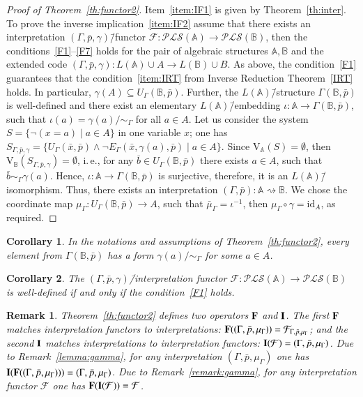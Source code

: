 \documentclass[12pt]{article}
\newtheorem{corollary}{Corollary}
\newtheorem{remark}{Remark}
\theoremstyle{definition}
\def\MA{{\mathbb{A}}}
\def\MB{{\mathbb{B}}}
\def\F{{\mathcal{F}}}
\def\PLS{{\mathcal{PLS}}}
\def\id{{\mathrm{id}}}
\def\V{{\mathrm{V}}}
\begin{document}
\begin{proof}[Proof of Theorem~\ref{th:functor2}]
Item~\ref{item:IF1} is given by Theorem~\ref{th:inter}. To prove the inverse implication~\ref{item:IF2} assume that there exists an interpretation $(\Gamma,\bar p,\gamma)$\=/functor $\F\colon\PLS(\MA)\to \PLS(\MB)$, then the  conditions~\ref{F1}--\ref{F7} holds for the pair of algebraic structures $\MA,\MB$ and the extended code $(\Gamma,\bar p,\gamma)\colon L(\MA)\cup A\to L(\MB)\cup B$. As above, the condition~\ref{F1} guarantees that the condition~\ref{item:IRT} from Inverse Reduction Theorem~\ref{IRT} holds. In particular, $\gamma(A)\subseteq U_\Gamma(\MB,\bar p)$. Further, the $L(\MA)$\=/structure $\Gamma(\MB,\bar p)$ is well-defined and there exist an elementary $L(\MA)$\=/embedding $\iota\colon \MA\to \Gamma(\MB,\bar p)$, such that 
$\iota(a)=\gamma(a)/{\sim_\Gamma}$ for all $a\in A$. Let us consider the system $S=\{\neg(x=a)\mid a\in A\}$ in one variable $x$; one has $S_{\Gamma,\bar p,\gamma}=\{U_\Gamma(\bar x,\bar p)\wedge \neg E_\Gamma(\bar x,\gamma(a),\bar p)\mid a\in A\}$. Since $\V_\MA(S)=\emptyset$, then $\V_\MB(S_{\Gamma,\bar p,\gamma})=\emptyset$, i.\,e., for any $\bar b\in U_\Gamma(\MB,\bar p)$ there exists $a\in A$, such that $\bar b\sim_\Gamma \gamma(a)$. Hence, $\iota\colon \MA\to \Gamma(\MB,\bar p)$ is surjective, therefore, it is an $L(\MA)$\=/isomorphism. Thus, there exists an interpretation $(\Gamma,\bar p)\colon \MA\rightsquigarrow \MB$. We chose the coordinate map $\mu_\Gamma\colon U_\Gamma(\MB,\bar p)\to A$, such that $\bar\mu_\Gamma=\iota^{-1}$, then $\mu_\Gamma\circ\gamma=\id_A$, as required.
\end{proof}

\begin{corollary}\label{cor:surj}
In the notations and assumptions of Theorem~\ref{th:functor2}, every element from $\Gamma(\MB,\bar p)$ has a form $\gamma(a)/{\sim_\Gamma}$ for some $a\in A$.
\end{corollary}

\begin{corollary}\label{cor:inj2}
The $(\Gamma,\bar p,\gamma)$\=/interpretation functor $\F\colon \PLS(\MA)\to \PLS(\MB)$ is well-defined if and only if the condition~\ref{F1} holds.
\end{corollary}

\begin{remark}\label{remark:gamma_int}
Theorem~\ref{th:functor2} defines two operators ${\bf F}$ and ${\bf I}$. The first ${\bf F}$ matches interpretation functors to interpretations: ${\bf F}((\Gamma,\bar p,\mu_\Gamma))= \F_{\Gamma,\bar p,\mu_\Gamma}$; and the second ${\bf I}$ matches interpretations to interpretation functors: ${\bf I}(\F)=(\Gamma,\bar p,\mu_\Gamma)$. Due to Remark~\ref{lemma:gamma}, for any interpretation $(\Gamma,\bar p,\mu_\Gamma)$ one has ${\bf I}({\bf F}((\Gamma,\bar p,\mu_\Gamma)))=(\Gamma,\bar p,\mu_\Gamma)$. Due to 
Remark~\ref{remark:gamma}, for any interpretation functor $\F$ one has ${\bf F}({\bf I}(\F))=\F$.
\end{remark}
\end{document}
